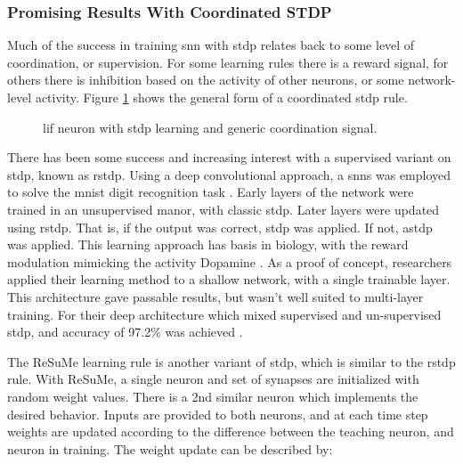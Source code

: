 \documentclass[conference]{IEEEtran}
\newcommand{\afig}[3]{
	\begin{figure}[H]
    	\centering
		\texttt{[image: \#1]}
        \caption{#2.}
        \label{#3}
	\end{figure}
}
\newcommand{\asvgf}[4]{
	\begin{figure}[!htbp]
    	\centering
		\adjustbox{max width=#4\linewidth}{}
        \caption{#2.}
        \label{#3}
	\end{figure}
}
\begin{document}
\subsubsection{Promising Results With Coordinated STDP}
Much of the success in training \gls{snn} with \gls{stdp} relates back to some
level of coordination, or supervision. For some learning rules there is a reward
signal, for others there is inhibition based on the activity of other neurons,
or some network-level activity. Figure \ref{fig:coordinated_stdp} shows the
general form of a coordinated \gls{stdp} rule.

\asvgf{figures/coordinated_stdp.svg}{\gls{lif} neuron with \gls{stdp}
  learning and generic coordination signal}{fig:coordinated_stdp}{0.5}

There has been some success and increasing interest with a supervised variant on
\gls{stdp}, known as \gls{rstdp}. Using a deep convolutional approach, a
\glspl{snn} was employed to solve the \gls{mnist} digit recognition task
\parencite{mozafari_2018}. Early layers of the network were trained in an
unsupervised manor, with classic \gls{stdp}. Later layers were updated using
\gls{rstdp}. That is, if the output was correct, \gls{stdp} was applied. If not,
\gls{astdp} was applied. This learning approach has basis in biology, with the
reward modulation mimicking the activity Dopamine \parencite{mozafari_2018}. As
a proof of concept, researchers applied their learning method to a shallow
network, with a single trainable layer. This architecture gave passable results,
but wasn't well suited to multi-layer training. For their deep architecture
which mixed supervised and un-supervised \gls{stdp}, and accuracy of 97.2\% was
achieved \parencite{mozafari_2018}.



The ReSuMe learning rule is another variant of \gls{stdp}, which is similar to
the \gls{rstdp} rule. With ReSuMe, a single neuron and set of synapses are
initialized with random weight values. There is a 2nd similar neuron which
implements the desired behavior. Inputs are provided to both neurons, and at
each time step weights are updated according to the difference between the
teaching neuron, and neuron in training. The weight update can be described by:
\end{document}
